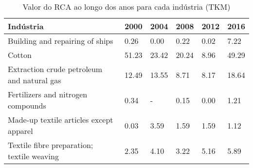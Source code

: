 \begin{table}
\centering
\caption{Valor do RCA ao longo dos anos para cada indústria (TKM)}
\begin{tabular}{p{6cm}p{1.5cm}p{1.5cm}p{1.5cm}p{1.5cm}p{1.5cm}}
\toprule
                                 Indústria &  2000 &  2004 &  2008 & 2012 &  2016 \\
\midrule
           Building and repairing of ships &  0.26 &  0.00 &  0.22 & 0.02 &  7.22 \\
                                    Cotton & 51.23 & 23.42 & 20.24 & 8.96 & 49.29 \\
Extraction crude petroleum and natural gas & 12.49 & 13.55 &  8.71 & 8.17 & 18.64 \\
        Fertilizers and nitrogen compounds &  0.34 &     - &  0.15 & 0.00 &  1.21 \\
   Made-up textile articles except apparel &  0.03 &  3.59 &  1.59 & 1.59 &  1.12 \\
Textile fibre preparation; textile weaving &  2.35 &  4.10 &  3.22 & 5.16 &  5.89 \\
\bottomrule
\end{tabular}
\end{table}
